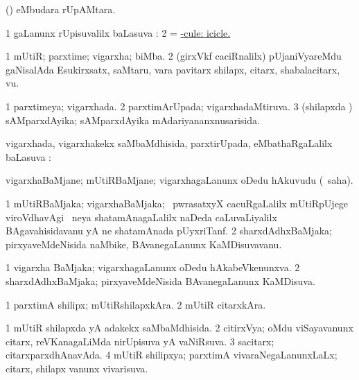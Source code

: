 \bentry
{}
\gl{\uparx}
\bmng
(\pArxparx)  eMbudara rUpAMtara. 
\emng
\eentry

\bentry
{}
\gl{\uparx}
\bmng
\bnum
\num{1} \nA gaLanunx rUpisuvalilx baLasuva \uparx:  
\num{2} = \hyperref{kandict_c.pdf}{C}{hyp-cule}{-cule: icicle.} 
\enum
\emng
\eentry

\bentry
{}
\gl{\nA}
\bmng
\bnum
\num{1} mUtiR; parxtime; vigarxha; biMba. 
\num{2} (girxVkf caciRnalilx) pUjaniVyareMdu gaNisalAda Esukirxsatx, saMtaru, \mo vara pavitarx shilapx, citarx, shabalacitarx, \mo vu. 
\enum
\emng
\eentry

\bentry
{}
\gl{\gu}
\bmng
\bnum
\num{1} parxtimeya; vigarxhada. 
\num{2} parxtimArUpada; vigarxhadaMtiruva. 
\num{3} (shilapxda \vi) sAMparxdAyika; sAMparxdAyika mAdariyananxnusarisida. 
\enum
\emng
\eentry

\bentry
{}
\gl{\sapUpa}
\bmng
vigarxhada, vigarxhakekx saMbaMdhisida, parxtirUpada, eMbathaRgaLalilx baLasuva \pUparx:  
\emng
\eentry

\bentry
{}
\gl{\nA}
\bmng
vigarxhaBaMjane; mUtiRBaMjane; vigarxhagaLanunx oDedu hAkuvudu (\rUpa\ saha). 
\emng
\eentry

\bentry
{}
\gl{\nA}
\bmng
\bnum
\num{1} mUtiRBaMjaka; vigarxhaBaMjaka; \kanmu\ pwrasatxyX cacuRgaLalilx mUtiRpUjege viroVdhavAgi \kirxsha\ neya shatamAnagaLalilx naDeda caLuvaLiyalilx BAgavahisidavanu yA ne shatamAnada pUyxriTanf. 
\num{2} sharxdAdhxBaMjaka; pirxyaveMdeNisida naMbike, BAvanegaLanunx KaMDisuvavanu. 
\enum
\emng
\eentry

\bentry
{}
\gl{\gu}
\bmng
\bnum
\num{1} vigarxha BaMjaka; vigarxhagaLanunx oDedu hAkabeVkenunxva. 
\num{2} sharxdAdhxBaMjaka; pirxyaveMdeNisida BAvanegaLanunx KaMDisuva. 
\enum
\emng
\eentry

\bentry
{}
\gl{\nA}
\bmng
\bnum
\num{1} parxtimA shilipx; mUtiRshilapxkAra. 
\num{2} mUtiR citarxkAra. 
\enum
\emng
\eentry

\bentry
{}
\gl{\gu}
\bmng
\bnum
\num{1} mUtiR shilapxda yA adakekx saMbaMdhisida. 
\num{2} citirxVya; oMdu viSayavanunx citarx, reVKanagaLiMda nirUpisuva yA vaNiRsuva. 
\num{3} sacitarx; citarxparxdhAnavAda. 
\num{4} mUtiR shilipxya; parxtimA vivaraNegaLanunxLaLx; citarx, shilapx \mo vanunx vivarisuva. 
\enum
\emng
\eentry

